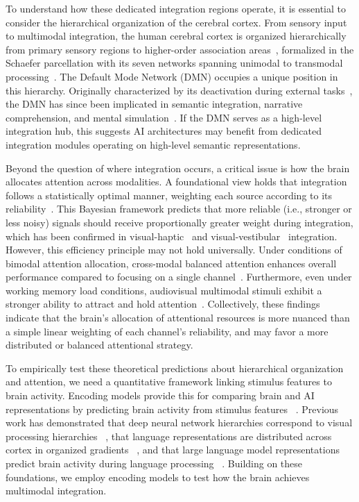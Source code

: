 \documentclass[10pt,letterpaper]{article}
\begin{document}
To understand how these dedicated integration regions operate, it is essential to consider the hierarchical organization of the cerebral cortex. From sensory input to multimodal integration, the human cerebral cortex is organized hierarchically from primary sensory regions to higher-order association areas~\citep{margulies2016situating}, formalized in the Schaefer parcellation with its seven networks spanning unimodal to transmodal processing~\citep{schaefer2018local}. The Default Mode Network (DMN) occupies a unique position in this hierarchy. Originally characterized by its deactivation during external tasks~\citep{me2001default}, the DMN has since been implicated in semantic integration, narrative comprehension, and mental simulation~\citep{mar2011neural,simony2016dynamic}. If the DMN serves as a high-level integration hub, this suggests AI architectures may benefit from dedicated integration modules operating on high-level semantic representations.

Beyond the question of where integration occurs, a critical issue is how the brain allocates attention across modalities. A foundational view holds that integration follows a statistically optimal manner, weighting each source according to its reliability~\citep{ernst2002humans,knill2004bayesian}. This Bayesian framework predicts that more reliable (i.e., stronger or less noisy) signals should receive proportionally greater weight during integration, which has been confirmed in visual-haptic~\citep{ernst2002humans} and visual-vestibular~\citep{fetsch2013bridging} integration. However, this efficiency principle may not hold universally. Under conditions of bimodal attention allocation, cross-modal balanced attention enhances overall performance compared to focusing on a single channel~\citep{mishra2012attention}. Furthermore, even under working memory load conditions, audiovisual multimodal stimuli exhibit a stronger ability to attract and hold attention~\citep{yichen2024modulation}. Collectively, these findings indicate that the brain's allocation of attentional resources is more nuanced than a simple linear weighting of each channel's reliability, and may favor a more distributed or balanced attentional strategy.

To empirically test these theoretical predictions about hierarchical organization and attention, we need a quantitative framework linking stimulus features to brain activity. Encoding models provide this for comparing brain and AI representations by predicting brain activity from stimulus features ~\citep{naselaris2011encoding}. Previous work has demonstrated that deep neural network hierarchies correspond to visual processing hierarchies ~\citep{gucclu2015deep}, that language representations are distributed across cortex in organized gradients ~\citep{huth2016natural}, and that large language model representations predict brain activity during language processing ~\citep{caucheteux2022brains}. Building on these foundations, we employ encoding models to test how the brain achieves multimodal integration.
\end{document}
